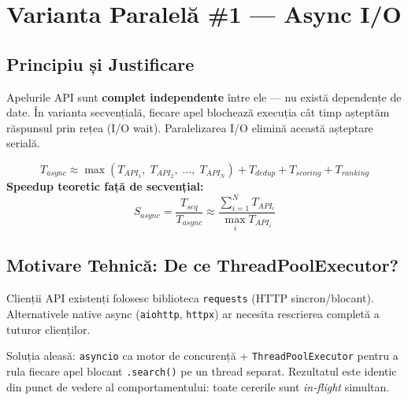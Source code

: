\documentclass[12pt,a4paper]{article}
\begin{document}
\section{Varianta Paralelă \#1 --- Async I/O}

\subsection{Principiu și Justificare}

Apelurile API sunt \textbf{complet independente} între ele --- nu există dependențe de date. În varianta secvențială, fiecare apel blochează execuția cât timp așteptăm răspunsul prin rețea (I/O wait). Paralelizarea I/O elimină această așteptare serială.

\begin{formulabox}
\[
T_{async} \approx \max\!\left(T_{API_1},\; T_{API_2},\; \ldots,\; T_{API_N}\right)
         + T_{dedup} + T_{scoring} + T_{ranking}
\]
\textbf{Speedup teoretic față de secvențial:}
\[
S_{async} = \frac{T_{seq}}{T_{async}} \approx \frac{\displaystyle\sum_{i=1}^{N} T_{API_i}}{\displaystyle\max_{i} T_{API_i}}
\]
\end{formulabox}

\subsection{Motivare Tehnică: De ce ThreadPoolExecutor?}

Clienții API existenți folosesc biblioteca \texttt{requests} (HTTP sincron/blocant). Alternativele native async (\texttt{aiohttp}, \texttt{httpx}) ar necesita rescrierea completă a tuturor clienților.

Soluția aleasă: \texttt{asyncio} ca motor de concurență + \texttt{ThreadPoolExecutor} pentru a rula fiecare apel blocant \texttt{.search()} pe un thread separat. Rezultatul este identic din punct de vedere al comportamentului: toate cererile sunt \emph{in-flight} simultan.
\end{document}
